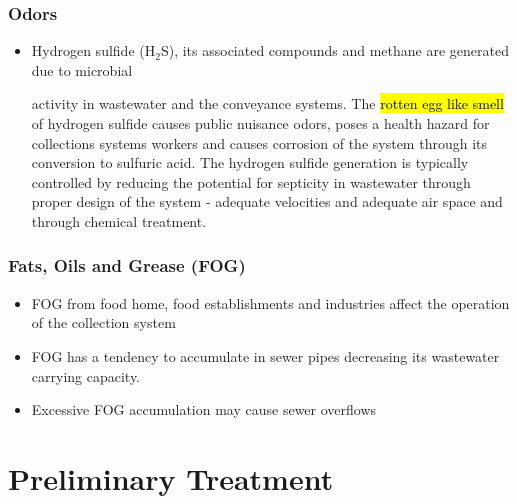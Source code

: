 \subsection{Odors}
\begin{itemize}
\item Hydrogen sulfide (H$_2$S), its associated compounds and methane are generated due to microbial

 activity in wastewater and the conveyance systems.  The \hl{rotten egg like smell} of hydrogen sulfide causes public nuisance odors, poses a health hazard for collections systems workers and causes corrosion of the system through its conversion to sulfuric acid.  The hydrogen sulfide generation is typically controlled by reducing the potential for septicity in wastewater through proper design of the system -  adequate velocities and adequate air space and through chemical treatment.
 \end{itemize}

\subsection{Fats, Oils and Grease (FOG)}
\begin{itemize}
\item FOG from food home, food establishments and industries affect the operation of the collection system
\item FOG has a tendency to accumulate in sewer pipes decreasing its wastewater carrying capacity.
\item Excessive FOG accumulation may cause sewer overflows
 \end{itemize}


\chapter{Preliminary Treatment}



